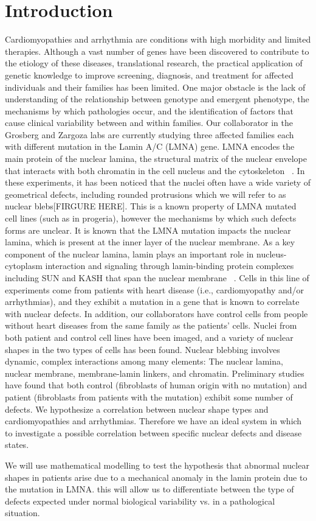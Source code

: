 \section{Introduction}
Cardiomyopathies and arrhythmia are conditions with high morbidity and limited therapies. Although a vast number of genes have been discovered to contribute to the etiology of these diseases, translational research, the practical application of genetic knowledge to improve screening, diagnosis, and treatment for affected individuals and their families has been limited. One major obstacle is the lack of understanding of the relationship between genotype and emergent phenotype, the mechanisms by which pathologies occur, and the identification of factors that cause clinical variability between and within families. Our collaborator in the Grosberg and Zargoza labs are currently studying three affected families each with different mutation in the Lamin A/C (LMNA) gene.  LMNA encodes the main protein of the nuclear lamina, the structural matrix of the nuclear envelope that interacts with both chromatin in the cell nucleus and the cytoskeleton ~\cite{Capell2006}. In these experiments, it has been noticed that the nuclei often have a wide variety of geometrical defects, including rounded protrusions which we will refer to as nuclear blebs[FIRGURE HERE]. This is a known property of LMNA mutated cell lines (such as in progeria), however the mechanisms by which such defects forms are unclear. It is known that the LMNA mutation impacts the nuclear lamina, which is present at the inner layer of the nuclear membrane. As a key component of the nuclear lamina, lamin plays an important role in nucleus-cytoplasm interaction and signaling through lamin-binding protein complexes including SUN and KASH that span the nuclear membrane ~\cite{Ho2012}. Cells in this line of experiments come from patients with heart disease (i.e., cardiomyopathy and/or arrhythmias), and they exhibit a mutation in a gene that is known to correlate with nuclear defects. In addition, our collaborators have control cells from people without heart diseases from the same family as the patients' cells.  Nuclei from both patient and control cell lines have been imaged, and  a variety of nuclear shapes in the two types of cells has been found. Nuclear blebbing involves dynamic, complex interactions among many elements: The nuclear lamina, nuclear membrane, membrane-lamin linkers, and chromatin. Preliminary studies have found that both control (fibroblasts of human origin with no mutation) and patient (fibroblasts from patients with the mutation) exhibit some number of defects. We hypothesize a correlation between nuclear shape types and cardiomyopathies and arrhythmias. Therefore we have an ideal system in which to investigate a possible correlation between specific nuclear defects and disease states.

We will use mathematical modelling to test the hypothesis that abnormal nuclear shapes in patients arise due to a mechanical anomaly in the lamin protein due to the mutation in LMNA. this will allow us to differentiate between the type of defects expected under normal biological variability vs. in a pathological situation. 